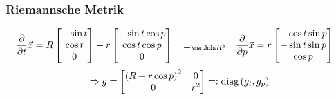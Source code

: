     \subsubsection{Riemannsche Metrik}
      \begin{align}
        \frac{\partial}{\partial t}\vec{x}
                   &=R \begin{bmatrix}
                          -\sin t \\
                          \cos t \\
                            0
                        \end{bmatrix}
                      +r\begin{bmatrix}
                        -\sin t \cos p \\
                        \cos t \cos p \\
                        0
                      \end{bmatrix}
              \quad\bot_{\R^{3}}\quad
              \frac{\partial}{\partial p}\vec{x}
              =r\begin{bmatrix}
                        -\cos t \sin p \\
                        -\sin t \sin p \\
                        \cos p
                \end{bmatrix}
      \end{align}
      \begin{align}
        \Rightarrow g = \begin{bmatrix}
                          \left( R + r\cos p \right)^{2} & 0 \\ 0 & r^{2}
                        \end{bmatrix}
          =: \text{diag}\left( g_{t}, g_{p} \right)
      \end{align}

